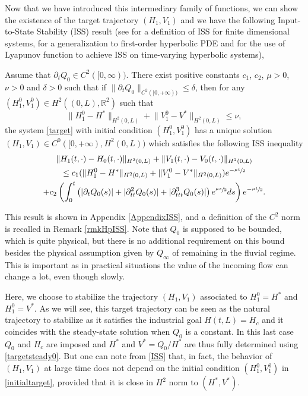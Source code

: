 Now that we have introduced this intermediary family of functions, we can show the existence of the target trajectory $(H_{1},V_{1})$ and
we have the following Input-to-State Stability (ISS) result {(see \cite{Sontag} for a definition of ISS for finite dimensional systems,
\cite[Chap.\,1, Chap.\,3]{IassonKrstic} for a generalization to first-order hyperbolic PDE and \cite{PrieurISS} for the use of Lyapunov function to achieve ISS on time-varying hyperbolic systems)},
\begin{prop}\label{propISS}
Assume that $\partial_{t}Q_{0}\in C^{2}([0,\infty))$. There exist positive constants $c_{1}$, $c_{2}$,
$\mu>0$, $\nu>0$ and $\delta>0$ such that if
$\lVert\partial_{t}Q_{0}\rVert_{C^{2}([0,+\infty))}\leq\delta$, then for any $(H_{1}^{0},V_{1}^{0})\in H^{2}((0,L),{\mathbb{R}^{2}})$ such that
\begin{equation*}
\lVert H_{1}^{0}-H^{*}\rVert_{H^{2}(0,L)}+\lVert V_{1}^{0}-V^{*}\rVert_{H^{2}(0,L)}\leq \nu,
\end{equation*}
the system \eqref{target} with initial condition $(H_{1}^{0},V_{1}^{0})$ has a unique solution $(H_{1},V_{1})\in C^{0}([0,+\infty),H^{2}(0,L))$ which satisfies the following ISS inequality
{\begin{multline}
\label{ISS}
\lVert H_{1}(t,\cdot)-H_{0}(t,\cdot)\rVert_{H^{2}(0,L)}+\lVert V_{1}(t,\cdot)-V_{0}(t,\cdot)\rVert_{H^{2}(0,L)}\\
\leq c_{1}(\lVert H_{1}^{0}-H^{*}\rVert_{H^{2}(0,L)}+\lVert V_{1}^{0}-V^{*}\rVert_{H^{2}(0,L)})e^{-\sfrac{\mu t}{2}}\\
+c_{2}\left(\int_{0}^{t}\left(|\partial_{t}Q_{0}(s)|+|\partial_{tt}^{2}Q_{0}(s)|+|\partial_{ttt}^{3}Q_{0}(s)|\right)e^{\sfrac{\mu s}{2}}ds\right)e^{-\sfrac{\mu t}{2}}.
\end{multline}}
\end{prop}
This result is shown in Appendix \ref{AppendixISS}, {and a definition of the $C^{2}$ norm is recalled in Remark \ref{rmkHpISS}}. Note that $Q_{0}$ is supposed to be bounded, which is quite physical, but there is no additional requirement on this bound besides the physical assumption given by $Q_{\infty}$ of remaining in the fluvial regime. This is important as in practical
situations the value of the incoming flow can change a lot, even though slowly.

Here, we {choose} to stabilize the trajectory $(H_{1},V_{1})$ associated to $H_{1}^{0}=H^{*}$ and $H_{1}^{0}=V^{*}$. As we will see, this target trajectory can be seen as the natural trajectory to stabilize as it satisfies the industrial goal $H(t,L)=H_{c}$
and it coincides with the steady-state solution when $Q_{0}$ is a constant.
{In this last case $Q_{0}$ and $H_{c}$ are imposed and $H^{*}$ and $V^{*}=Q_{0}/H^{*}$ are thus fully determined using \eqref{targetsteady0}.}
But one can note from \eqref{ISS} that, in fact, the behavior of $(H_{1},V_{1})$ at large time does not depend on the initial condition $(H_{1}^{0},V_{1}^{0})$ in \eqref{initialtarget}, provided that it is close in $H^{2}$ norm to $(H^{*},V^{*})$.

